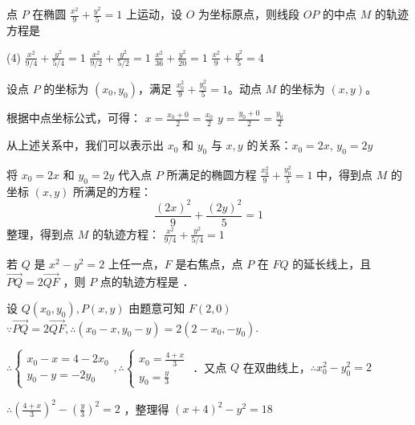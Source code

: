 \begin{example}
    点 $P$ 在椭圆 $\frac{x^2}{9} + \frac{y^2}{5} = 1$ 上运动，设 $O$ 为坐标原点，则线段 $OP$ 的中点 $M$ 的轨迹方程是
    \begin{tasks}(4)
        \task $\frac{x^2}{9/4} + \frac{y^2}{5/4} = 1$
        \task $\frac{x^2}{9/2} + \frac{y^2}{5/2} = 1$
        \task $\frac{x^2}{36} + \frac{y^2}{20} = 1$
        \task $\frac{x^2}{9} + \frac{y^2}{5} = 4$
    \end{tasks}
\end{example}
\begin{solution}
    设点 $P$ 的坐标为 $(x_0, y_0)$，满足 $\frac{x_0^2}{9} + \frac{y_0^2}{5} = 1$。动点 $M$ 的坐标为 $(x, y)$。

    根据中点坐标公式，可得：
    $x = \frac{x_0+0}{2} = \frac{x_0}{2}$
    $y = \frac{y_0+0}{2} = \frac{y_0}{2}$

    从上述关系中，我们可以表示出 $x_0$ 和 $y_0$ 与 $x, y$ 的关系：$x_0 = 2x$, $y_0 = 2y$

    将 $x_0 = 2x$ 和 $y_0 = 2y$ 代入点 $P$ 所满足的椭圆方程 $\frac{x_0^2}{9} + \frac{y_0^2}{5} = 1$ 中，得到点 $M$ 的坐标 $(x,y)$ 所满足的方程：
    $$\frac{(2x)^2}{9} + \frac{(2y)^2}{5} = 1$$
    整理，得到点 $M$ 的轨迹方程：
    $\frac{x^2}{9/4} + \frac{y^2}{5/4} = 1$
\end{solution}

\vspace{2em}

\begin{example}
    若 $Q$ 是 $x^2-y^2=2$ 上任一点，$F$ 是右焦点，点 $P$ 在 $F Q$ 的延长线上，且 $\overrightarrow{P Q}=2 \overrightarrow{Q F}$ ，则 $P$ 点的轨迹方程是 \underline{\qquad}．
\end{example}

\begin{solution}
    设 $Q\left(x_0, y_0\right), P(x, y)$ 由题意可知 $F(2,0)$
    $\because \overrightarrow{P Q}=2 \overrightarrow{Q F}, \therefore\left(x_0-x, y_0-y\right)=2\left(2-x_0,-y_0\right)$.

    \vspace{0.2cm}

    $\therefore\left\{\begin{array}{l}x_0-x=4-2 x_0 \\ y_0-y=-2 y_0\end{array}, \therefore\left\{\begin{array}{l}x_0=\frac{4+x}{3} \\ y_0=\frac{y}{3}\end{array}\right.\right.$ ．又点 $Q$ 在双曲线上，$\therefore x_0^2-y_0^2=2$

    \begin{center}
        $\therefore\left(\frac{4+x}{3}\right)^2-\left(\frac{y}{3}\right)^2=2$ ，整理得 $(x+4)^2-y^2=18$
    \end{center}
\end{solution}

